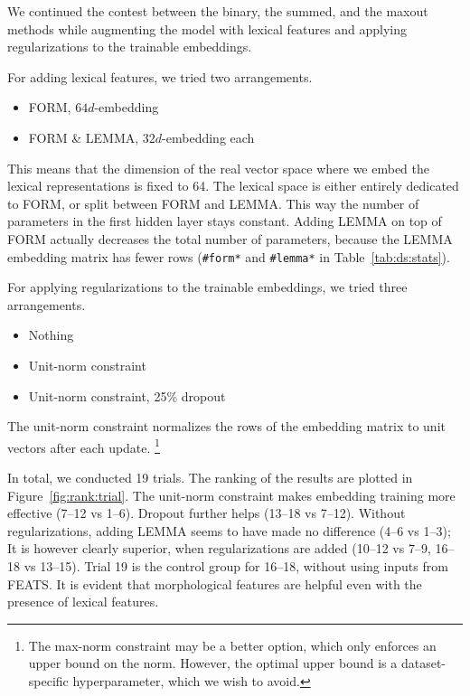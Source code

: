 \documentclass[11pt]{article}
\begin{document}
We continued the contest between the binary, the summed, and the maxout methods
while augmenting the model with lexical features and applying regularizations to the trainable embeddings.

For adding lexical features,
we tried two arrangements.

\begin{itemize}
  \ttfamily
\item FORM, \(64d\)-embedding
\item FORM \& LEMMA, \(32d\)-embedding each
\end{itemize}

This means that the dimension of the real vector space where we embed the lexical representations is fixed to 64.
The lexical space is either entirely dedicated to FORM,
or split between FORM and LEMMA\@.
This way the number of parameters in the first hidden layer stays constant.
Adding LEMMA on top of FORM actually decreases the total number of parameters,
because the LEMMA embedding matrix has fewer rows
(\texttt{\#form*} and \texttt{\#lemma*} in Table~\ref{tab:ds:stats}).

For applying regularizations to the trainable embeddings,
we tried three arrangements.

\begin{itemize}
  \ttfamily
\item Nothing
\item Unit-norm constraint
\item Unit-norm constraint, 25\% dropout
\end{itemize}

The unit-norm constraint normalizes the rows of the embedding matrix to unit vectors after each update.%
\footnote{The max-norm constraint may be a better option,
  which only enforces an upper bound on the norm.
  However, the optimal upper bound is a dataset-specific hyperparameter,
  which we wish to avoid.}

In total, we conducted 19 trials.
The ranking of the results are plotted in Figure~\ref{fig:rank:trial}.
The unit-norm constraint makes embedding training more effective (7--12 vs 1--6).
Dropout further helps (13--18 vs 7--12).
Without regularizations, adding LEMMA seems to have made no difference (4--6 vs 1--3);
It is however clearly superior, when regularizations are added (10--12 vs 7--9, 16--18 vs 13--15).
Trial 19 is the control group for 16--18,
without using inputs from FEATS\@.
It is evident that morphological features are helpful even with the presence of lexical features.
\end{document}

